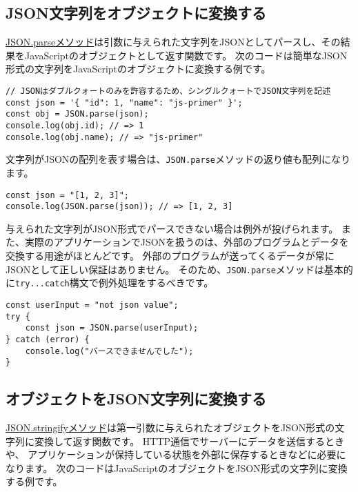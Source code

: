 \hypertarget{json-parse}{%
\subsection{JSON文字列をオブジェクトに変換する}\label{json-parse}}

\href{https://developer.mozilla.org/ja/docs/Web/JavaScript/Reference/Global_Objects/JSON/parse}{JSON.parseメソッド}は引数に与えられた文字列をJSONとしてパースし、その結果をJavaScriptのオブジェクトとして返す関数です。
次のコードは簡単なJSON形式の文字列をJavaScriptのオブジェクトに変換する例です。

\begin{lstlisting}
// JSONはダブルクォートのみを許容するため、シングルクォートでJSON文字列を記述
const json = '{ "id": 1, "name": "js-primer" }';
const obj = JSON.parse(json);
console.log(obj.id); // => 1
console.log(obj.name); // => "js-primer"
\end{lstlisting}

文字列がJSONの配列を表す場合は、\texttt{JSON.parse}メソッドの返り値も配列になります。

\begin{lstlisting}
const json = "[1, 2, 3]";
console.log(JSON.parse(json)); // => [1, 2, 3]
\end{lstlisting}

与えられた文字列がJSON形式でパースできない場合は例外が投げられます。
また、実際のアプリケーションでJSONを扱うのは、外部のプログラムとデータを交換する用途がほとんどです。
外部のプログラムが送ってくるデータが常にJSONとして正しい保証はありません。
そのため、\texttt{JSON.parse}メソッドは基本的に\texttt{try...catch}構文で例外処理をするべきです。

\begin{lstlisting}
const userInput = "not json value";
try {
    const json = JSON.parse(userInput);
} catch (error) {
    console.log("パースできませんでした");
}
\end{lstlisting}

\hypertarget{json-format}{%
\subsection{オブジェクトをJSON文字列に変換する}\label{json-format}}

\href{https://developer.mozilla.org/ja/docs/Web/JavaScript/Reference/Global_Objects/JSON/stringify}{JSON.stringifyメソッド}は第一引数に与えられたオブジェクトをJSON形式の文字列に変換して返す関数です。
HTTP通信でサーバーにデータを送信するときや、
アプリケーションが保持している状態を外部に保存するときなどに必要になります。
次のコードはJavaScriptのオブジェクトをJSON形式の文字列に変換する例です。

